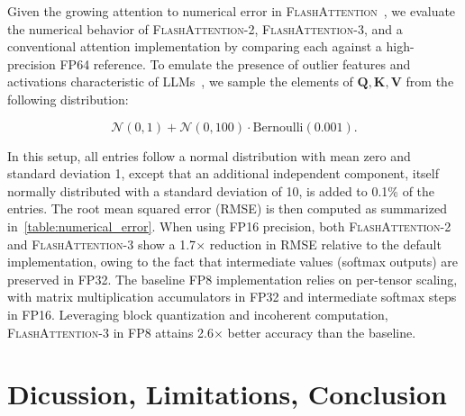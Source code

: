 Given the growing attention to numerical error in \textsc{FlashAttention}~\citep{golden2024flash}, we evaluate the numerical behavior of \textsc{FlashAttention-2}, \textsc{FlashAttention-3}, and a conventional attention implementation by comparing each against a high-precision FP64 reference. To emulate the presence of outlier features and activations characteristic of LLMs~\citep{dettmers2208llm, sun2024massive}, we sample the elements of $\mathbf{Q}, \mathbf{K}, \mathbf{V}$ from the following distribution:

\begin{equation*}
  \mathcal{N}(0, 1) + \mathcal{N}(0, 100) \cdot \mathrm{Bernoulli}(0.001).
\end{equation*}

In this setup, all entries follow a normal distribution with mean zero and standard deviation 1, except that an additional independent component, itself normally distributed with a standard deviation of 10, is added to 0.1\% of the entries. The root mean squared error (RMSE) is then computed as summarized in~\cref{table:numerical_error}. When using FP16 precision, both \textsc{FlashAttention-2} and \textsc{FlashAttention-3} show a 1.7$\times$ reduction in RMSE relative to the default implementation, owing to the fact that intermediate values (softmax outputs) are preserved in FP32. The baseline FP8 implementation relies on per-tensor scaling, with matrix multiplication accumulators in FP32 and intermediate softmax steps in FP16. Leveraging block quantization and incoherent computation, \textsc{FlashAttention-3} in FP8 attains 2.6$\times$ better accuracy than the baseline.

\section{Dicussion, Limitations, Conclusion}
\label{sec:discussion}

